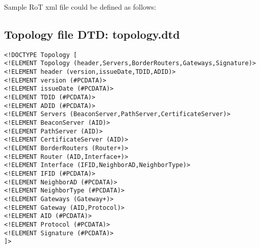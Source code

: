 Sample RoT xml file could be defined as follows:


\subsection{Topology file DTD: topology.dtd}
\label{sec:topologydtd}

\begin{verbatim}
<!DOCTYPE Topology [
<!ELEMENT Topology (header,Servers,BorderRouters,Gateways,Signature)>
<!ELEMENT header (version,issueDate,TDID,ADID)>
<!ELEMENT version (#PCDATA)>
<!ELEMENT issueDate (#PCDATA)>
<!ELEMENT TDID (#PCDATA)>
<!ELEMENT ADID (#PCDATA)>
<!ELEMENT Servers (BeaconServer,PathServer,CertificateServer)>
<!ELEMENT BeaconServer (AID)>
<!ELEMENT PathServer (AID)>
<!ELEMENT CertificateServer (AID)>
<!ELEMENT BorderRouters (Router+)>
<!ELEMENT Router (AID,Interface+)>
<!ELEMENT Interface (IFID,NeighborAD,NeighborType)>
<!ELEMENT IFID (#PCDATA)>
<!ELEMENT NeighborAD (#PCDATA)>
<!ELEMENT NeighborType (#PCDATA)>
<!ELEMENT Gateways (Gateway+)>
<!ELEMENT Gateway (AID,Protocol)>
<!ELEMENT AID (#PCDATA)>
<!ELEMENT Protocol (#PCDATA)>
<!ELEMENT Signature (#PCDATA)>
]>
\end{verbatim}


